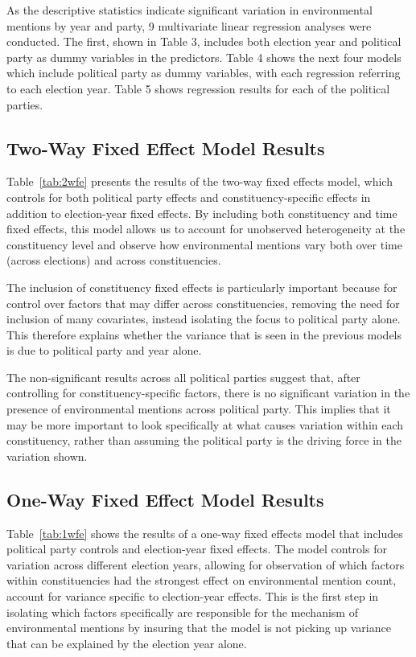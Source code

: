 \documentclass[preprint]{elsarticle} %
\begin{document}
\newpage

As the descriptive statistics indicate significant variation in environmental mentions by year and party, 9 multivariate linear regression analyses were conducted. The first, shown in Table 3, includes both election year and political party as dummy variables in the predictors. Table 4 shows the next four models which include political party as dummy variables, with each regression referring to each election year. Table 5 shows regression results for each of the political parties.



\subsection{Two-Way Fixed Effect Model Results}

Table~\ref{tab:2wfe} presents the results of the two-way fixed effects model, which controls for both political party effects and constituency-specific effects in addition to election-year fixed effects. By including both constituency and time fixed effects, this model allows us to account for unobserved heterogeneity at the constituency level and observe how environmental mentions vary both over time (across elections) and across constituencies.

The inclusion of constituency fixed effects is particularly important because for control over factors that may differ across constituencies, removing the need for inclusion of many covariates, instead isolating the focus to political party alone. This therefore explains whether the variance that is seen in the previous models is due to political party and year alone.

The non-significant results across all political parties suggest that, after controlling for constituency-specific factors, there is no significant variation in the presence of environmental mentions across political party. This implies that it may be more important to look specifically at what causes variation within each constituency, rather than assuming the political party is the driving force in the variation shown.


\subsection{One-Way Fixed Effect Model Results}

Table~\ref{tab:1wfe} shows the results of a one-way fixed effects model that includes political party controls and election-year fixed effects. The model controls for variation across different election years, allowing for observation of which factors within constituencies had the strongest effect on environmental mention count, account for variance specific to election-year effects. This is the first step in isolating which factors specifically are responsible for the mechanism of environmental mentions by insuring that the model is not picking up variance that can be explained by the election year alone.
\end{document}
